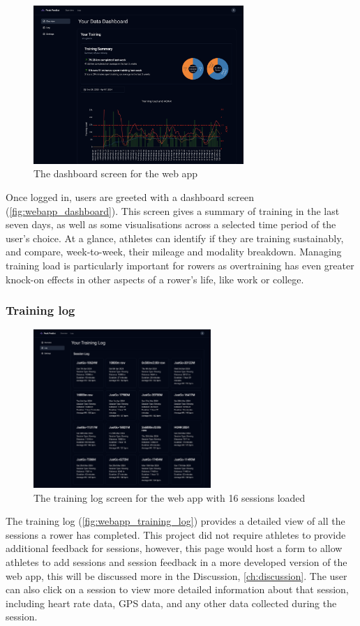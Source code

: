 \begin{figure}[htbp]
  \centering
  \includegraphics[height=6cm]{figures/fyp_dash_overview.png}
  \captionsetup{justification=centering}
  \caption[Web app Dashboard]{The dashboard screen for the web app} \label{fig:webapp_dashboard}
\end{figure}

Once logged in, users are greeted with a dashboard screen (\autoref{fig:webapp_dashboard}). This screen gives a summary of training in the last seven days, as well as some visualisations across a selected time period of the user's choice. At a glance, athletes can identify if they are training sustainably, and compare, week-to-week, their mileage and modality breakdown. Managing training load is particularly important for rowers as overtraining has even greater knock-on effects in other aspects of a rower's life, like work or college. 

\subsubsection{Training log}

\begin{figure}[htbp]
  \centering
  \includegraphics[height=6cm]{figures/fyp_training_log.png}
  \captionsetup{justification=centering}
  \caption[Web app Training Log]{The training log screen for the web app with 16 sessions loaded} \label{fig:webapp_training_log}
\end{figure}
The training log (\autoref{fig:webapp_training_log}) provides a detailed view of all the sessions a rower has completed. This project did not require athletes to provide additional feedback for sessions, however, this page would host a form to allow athletes to add sessions and session feedback in a more developed version of the web app, this will be discussed more in the Discussion, \autoref{ch:discussion}. The user can also click on a session to view more detailed information about that session, including heart rate data, GPS data, and any other data collected during the session. 

